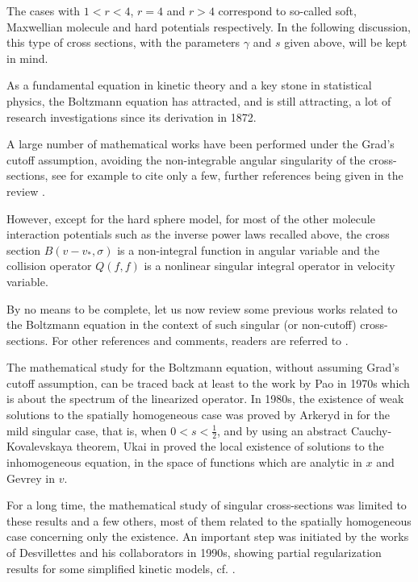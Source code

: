 \documentclass{amsart}[12pt, article]
\begin{document}
The cases with
$1<r<4$, $r=4$ and $r>4$ correspond to so-called soft, Maxwellian molecule
and hard
 potentials respectively. In the following discussion, this type of cross sections, with the parameters $\gamma$ and
$s$ given above, will be kept in mind.

As a fundamental equation in kinetic theory and
a key stone in statistical physics, the Boltzmann equation
has attracted, and is still attracting, a lot of research investigations since its derivation in 1872.

A large number of mathematical works have been performed under the Grad's cutoff
assumption, avoiding the non-integrable angular singularity
of the cross-sections, see for example \cite{Ce88,Cercignani-Illner-Pulvirenti,D-L,Grad,grad1,
guo-1,Lu,K-S,Lions94,ukai-2} to cite only a few, further references being given in the review \cite{villani2}.

However, except for the hard sphere model, for most of the other molecule
interaction potentials such as the inverse
power laws recalled above,
 the cross section  $B(v-v_*,\sigma)$ is a non-integral function in
angular variable
and the collision operator $Q(f,f)$ is a nonlinear singular integral operator
in 
velocity
variable.

By no means to be complete, let us now review some previous works related to the Boltzmann equation in the context of such singular (or non-cutoff) cross-sections. For other
 references and comments,  readers are referred to \cite{alex-review,villani2}.

The mathematical study for the Boltzmann equation, without assuming Grad's cutoff assumption, can be traced back at least to the work by Pao in
1970s \cite{Pao} which is about the spectrum of the linearized operator.
In 1980s, the existence of weak solutions to the spatially
homogeneous case was  proved by Arkeryd in \cite{Arkeryd} for the mild
singular case, that is, when $0<s<\frac 12$, and by using an abstract
Cauchy-Kovalevskaya theorem, Ukai in \cite{ukai} proved the local
existence of solutions to the inhomogeneous equation, in the space of functions which are analytic
in $x$ and Gevrey in $v$.

For a long time, the mathematical study of  singular cross-sections was limited to these results and a few others, most of them related to the spatially  homogeneous case
concerning only the existence. An important step was initiated by the
 works of Desvillettes and his collaborators in 1990s, showing partial regularization results for some
simplified kinetic models, cf. \cite{D95,desv-ajout1,
desv-ajout2,desv-F,desv-golse,desv-vil,Vi99}.
\end{document}
